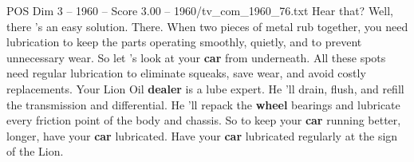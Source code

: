 \begin{textsample}{POS Dim 3 – 1960 – Score 3.00 – 1960/tv\_com\_1960\_76.txt}  \label{ex:f3_pos_028}
Hear that?
Well, there 's an easy solution.
There.
When two pieces of metal rub together, you need lubrication to keep the parts operating smoothly, quietly, and to prevent unnecessary wear.
So let 's look at your \textbf{car} from underneath.
All these spots need regular lubrication to eliminate squeaks, save wear, and avoid costly replacements.
Your Lion Oil \textbf{dealer} is a lube expert.
He 'll drain, flush, and refill the transmission and differential.
He 'll repack the \textbf{wheel} bearings and lubricate every friction point of the body and chassis.
So to keep your \textbf{car} running better, longer, have your \textbf{car} lubricated.
Have your \textbf{car} lubricated regularly at the sign of the Lion.

\end{textsample}
